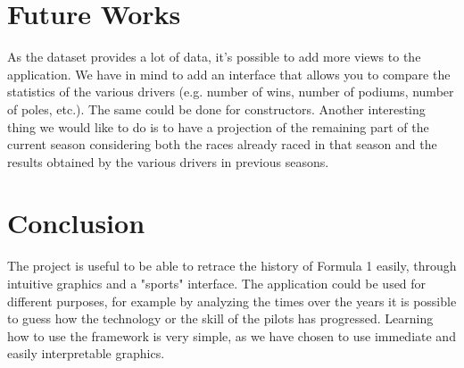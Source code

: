\documentclass[11pt,twocolumn,letterpaper]{article}
\begin{document}
\section{Future Works}
As the dataset provides a lot of data, it's possible to add more views to the application. We have in mind to add an interface that allows you to compare the statistics of the various 
drivers (e.g. number of wins, number of podiums, number of poles, etc.). The same could be done for constructors. Another interesting thing we would like to do is to have a projection of the remaining part of the current season considering both the races already raced in that season and the results obtained by the various drivers in previous seasons.

\section{Conclusion}
The project is useful to be able to retrace the history of Formula 1 easily, through intuitive graphics and a "sports" interface. The application could be used for different purposes,
for example by analyzing the times over the years it is possible to guess how the technology or the skill of the pilots has progressed.
Learning how to use the framework is very simple, as we have chosen to use immediate and easily interpretable graphics. 

\clearpage

\end{document}
